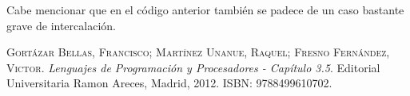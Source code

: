 \documentclass{article}
\begin{document}


Cabe mencionar que en el c\'odigo anterior tambi\'en se padece de un caso bastante grave de intercalaci\'on.



\begin{thebibliography}{99}
	\textsc{Gort\'azar Bellas, Francisco; Mart\'inez Unanue, Raquel; Fresno Fern\'andez, Victor}. \textit{Lenguajes de Programaci\'on y Procesadores - Cap\'itulo 3.5}. Editorial Universitaria Ramon Areces, Madrid, 2012. \textsc{ISBN: 9788499610702}.
\end{thebibliography}
\end{document}
